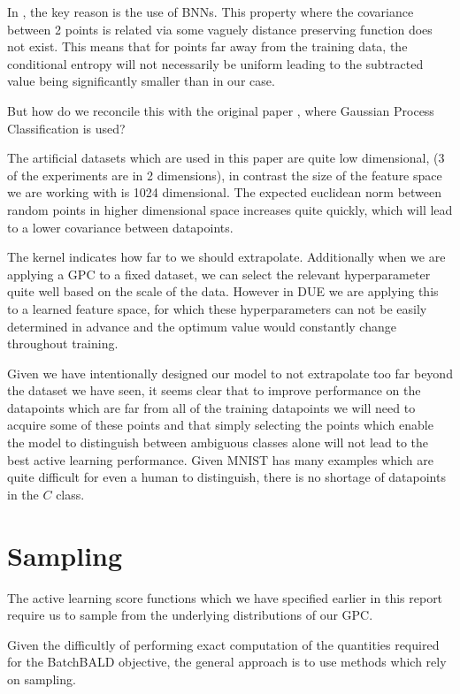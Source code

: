 \documentclass[12pt, a4paper]{report}
\theoremstyle{definition}
\theoremstyle{definition}
\theoremstyle{definition}
\begin{document}
In \cite{kirsch2019batchbald}, the key reason is the use of BNNs. This property where the covariance between 2 points is related via some vaguely distance preserving function does not exist. This means that for points far away from the training data, the conditional entropy will not necessarily be uniform leading to the subtracted value being significantly smaller than in our case.

But how do we reconcile this with the original paper \cite{houlsby2011bayesian}, where Gaussian Process Classification is used?


The artificial datasets which are used in this paper are quite low dimensional, (3 of the experiments are in 2 dimensions), in contrast the size of the feature space we are working with is 1024 dimensional. The expected euclidean norm between random points in higher dimensional space increases quite quickly, which will lead to a lower covariance between datapoints.

The kernel indicates how far to we should extrapolate. Additionally when we are applying a GPC to a fixed dataset, we can select the relevant hyperparameter quite well based on the scale of the data. However in DUE we are applying this to a learned feature space, for which these hyperparameters can not be easily determined in advance and the optimum value would constantly change throughout training.


Given we have intentionally designed our model to not extrapolate too far beyond the dataset we have seen, it seems clear that to improve performance on the datapoints which are far from all of the training datapoints we will need to acquire some of these points and that simply selecting the points which enable the model to distinguish between ambiguous classes alone will not lead to the best active learning performance. Given MNIST has many examples which are quite difficult for even a human to distinguish, there is no shortage of datapoints in the $C$ class.


\section{Sampling}

The active learning score functions which we have specified earlier in this report require us to sample from the underlying distributions of our GPC.

Given the difficultly of performing exact computation of the quantities required for the BatchBALD objective, the general approach is to use methods which rely on sampling.
\end{document}
